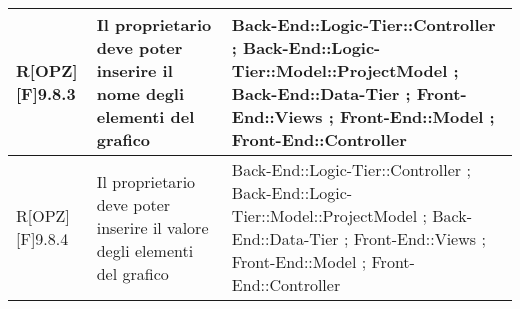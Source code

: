 \begin{table}[h]
\begin{tabular}{|p{}|p{}|p{}|}
			R[OPZ][F]9.8.3 & Il proprietario deve poter inserire il nome degli elementi del grafico  & Back-End::Logic-Tier::Controller ; Back-End::Logic-Tier::Model::ProjectModel ; Back-End::Data-Tier ; Front-End::Views ; Front-End::Model ; Front-End::Controller \\ \midrule
			R[OPZ][F]9.8.4 & Il proprietario deve poter inserire il valore degli elementi del grafico & Back-End::Logic-Tier::Controller ; Back-End::Logic-Tier::Model::ProjectModel ; Back-End::Data-Tier ; Front-End::Views ; Front-End::Model ; Front-End::Controller \\ \midrule

	\end{tabular}
	\end{table}
	\newpage
	
	\begin{table}[h]
		\begin{tabular}{|p{}|p{}|p{}|}
			\midrule
	

\end{tabular}
\end{table}
